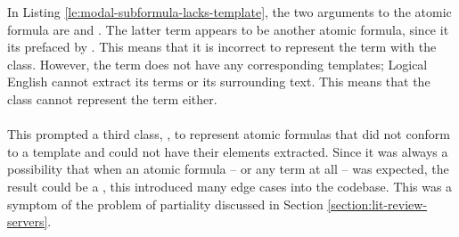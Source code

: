 \documentclass[../main.tex]{subfiles}
\begin{document}
In Listing \ref{le:modal-subformula-lacks-template}, the two arguments to the atomic formula  are  and . The latter term  appears to be another atomic formula, since it its prefaced by . This means that it is incorrect to represent the term with the  class. However, the term does not have any corresponding templates; Logical English cannot extract its terms or its surrounding text. This means that the  class cannot represent the term either.
\\
\\
This prompted a third class, , to represent atomic formulas that did not conform to a template and could not have their elements extracted. Since it was always a possibility that when an atomic formula -- or any term at all -- was expected, the result could be a , this introduced many edge cases into the codebase. This was a symptom of the problem of partiality discussed in Section \ref{section:lit-review-servers}.

\end{document}
